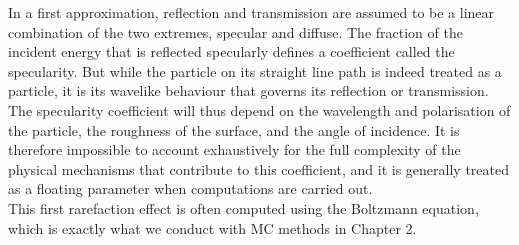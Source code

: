 In a first approximation, reflection and transmission are assumed to be a linear
combination of the two extremes, specular and diffuse. The fraction of the incident
energy that is reflected specularly defines a coefficient called the specularity. But
while the particle on its straight line path is indeed treated as a particle, it is its
wavelike behaviour that governs its reflection or transmission. The specularity coefficient
will thus depend on the wavelength and polarisation of the particle, the
roughness of the surface, and the angle of incidence. It is therefore impossible to
account exhaustively for the full complexity of the physical mechanisms that contribute
to this coefficient, and it is generally treated as a floating parameter when
computations are carried out.\\
\indent This first rarefaction effect is often computed using the Boltzmann equation, which is exactly what we conduct with MC methods in Chapter 2.

